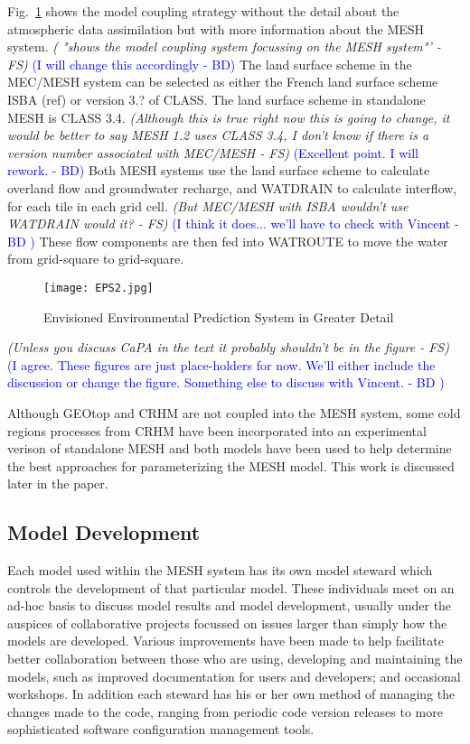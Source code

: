 \documentclass[hess]{copernicus}
\begin{document}
Fig.~\ref{eps2} shows the model coupling strategy without the detail about the atmospheric data assimilation but with more information about the MESH system. {\em ( "shows the model coupling system focussing on the MESH system"' - FS)}\textcolor{blue}{ (I will change this accordingly - BD) }The land surface scheme in the MEC/MESH system can be selected as either the French land surface scheme ISBA (ref) or version 3.? of CLASS. The land surface scheme in standalone MESH is CLASS 3.4. {\em (Although this is true right now this is going to change, it would be better to say MESH 1.2 uses CLASS 3.4, I don't know if there is a version number associated with MEC/MESH - FS)}\textcolor{blue}{ (Excellent point. I will rework. - BD) }Both MESH systems use the land surface scheme to calculate overland flow and groundwater recharge, and WATDRAIN to calculate interflow, for each tile in each grid cell. {\em (But MEC/MESH with ISBA wouldn't use WATDRAIN would it? - FS)}\textcolor{blue}{ (I think it does... we'll have to check with Vincent - BD ) }These flow components are then fed into WATROUTE to move the water from grid-square to grid-square.

\begin{figure}[h!]
\vspace*{2mm}
\begin{center}
\texttt{[image: EPS2.jpg]}
\end{center}
\caption{Envisioned Environmental Prediction System in Greater Detail}
\label{eps2}
\end{figure}

{\em (Unless you discuss CaPA in the text it probably shouldn't be in the figure - FS)}\textcolor{blue}{ (I agree. These figures are just place-holders for now. We'll either include the discussion or change the figure. Something else to discuss with Vincent. - BD )}

Although GEOtop and CRHM are not coupled into the MESH system, some cold regions processes from CRHM have been incorporated into an experimental verison of standalone MESH and both models have been used to help determine the best approaches for parameterizing the MESH model. This work is discussed later in the paper.

\subsection{Model Development}
Each model used within the MESH system has its own model steward which controls the development of that particular model. These individuals meet on an ad-hoc basis to discuss model results and model development, usually under the auspices of collaborative projects focussed on issues larger than simply how the models are developed. Various improvements have been made to help facilitate better collaboration between those who are using, developing and maintaining the models, such as improved documentation for users and developers; and occasional workshops. In addition each steward has his or her own method of managing the changes made to the code, ranging from periodic code version releases to more sophisticated software configuration management tools.
\end{document}
